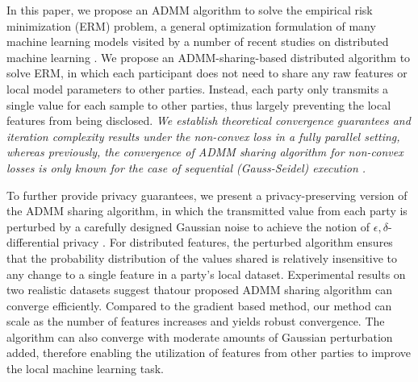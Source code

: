 In this paper, we propose an ADMM algorithm to solve the empirical risk minimization (ERM) problem, a general optimization formulation of many machine learning models visited by a number of recent studies on distributed machine learning  \cite{ying2018supervised,chaudhuri2011differentially}. We propose an ADMM-sharing-based distributed algorithm to solve ERM, in which each participant does not need to share any raw features or local model parameters to other parties. Instead, each party only transmits a single value for each sample to other parties, thus largely preventing the local features from being disclosed. 
\emph{We establish theoretical convergence guarantees and iteration complexity results under the non-convex loss in a fully parallel setting, whereas previously, the convergence of ADMM sharing algorithm for non-convex losses is only known for the case of sequential (Gauss-Seidel) execution \cite{hong2016convergence}.
}

To further provide privacy guarantees, we present a privacy-preserving version of the ADMM sharing algorithm, in which the transmitted value from each party is perturbed by a carefully designed Gaussian noise to achieve
the notion of $\epsilon,\delta$-differential privacy \cite{dwork2008differential,dwork2014algorithmic}. For distributed features, the perturbed algorithm ensures that the probability distribution of the values shared is relatively insensitive to any change to a single feature in a party's local dataset.
Experimental results on two realistic datasets suggest thatour proposed ADMM sharing algorithm can converge efficiently. Compared to the gradient based method, our method can scale as the number of features increases and yields robust convergence. The algorithm can also converge with moderate amounts of Gaussian perturbation added, therefore enabling the utilization of features from other parties to improve the local machine learning task.
